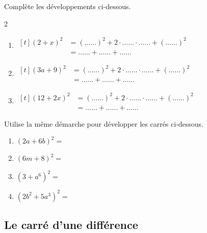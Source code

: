 \documentclass[../../syllabus_2.tex]{subfiles}
\begin{document}
\begin{exercise}
  Complète les développements ci-dessous.
  \begin{spacing}{2}
    \begin{enumerate}[itemsep=0.5cm]
      \item $
              \begin{aligned}[t]
                \left(2+x\right)^2 & = \left(\ldots \ldots\right)^2 + 2 \cdot  \ldots \ldots \cdot  \ldots \ldots + \left( \ldots \ldots\right)^2 \\
                                   & =  \ldots \ldots +  \ldots \ldots +  \ldots \ldots
              \end{aligned}
            $
      \item $
              \begin{aligned}[t]
                \left(3a+9\right)^2
                 & = \left( \ldots \ldots\right)^2 + 2 \cdot  \ldots \ldots \cdot  \ldots \ldots + \left( \ldots \ldots\right)^2 \\
                 & =  \ldots \ldots +  \ldots \ldots +  \ldots \ldots
              \end{aligned}
            $
      \item $
              \begin{aligned}[t]
                \left(12+2x\right)^2
                 & = \left( \ldots \ldots\right)^2 + 2 \cdot  \ldots \ldots \cdot  \ldots \ldots + \left( \ldots \ldots\right)^2 \\
                 & =  \ldots \ldots +  \ldots \ldots +  \ldots \ldots
              \end{aligned}
            $
    \end{enumerate}
  \end{spacing}
\end{exercise}

\newpage
\begin{exercise}
  Utilise la même démarche pour développer les carrés ci-dessous.
  \begin{enumerate}[cols=2, itemsep=2cm]
    \item  $\left(2a+6b\right)^2=$
    \item  $\left(6m+8\right)^2=$
    \item  $\left(3+a^6\right)^2=$
    \item  $\left(2b^2 + 5a^3\right)^2=$
  \end{enumerate}
\end{exercise}

\newpage
\subsection{Le carré d'une différence}
\end{document}
